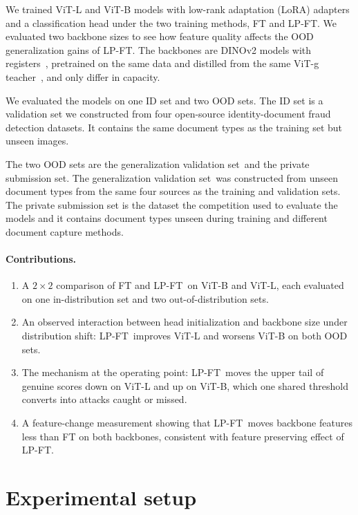 \documentclass[10pt]{article}
\newcommand{\lpft}{LP-FT}
\newcommand{\genval}{generalization validation set}
\begin{document}
We trained ViT-L and ViT-B models with low-rank adaptation (LoRA) adapters and a classification head under the two training methods, FT and \lpft. We evaluated two backbone sizes to see how feature quality affects the OOD generalization gains of \lpft. The backbones are DINOv2 models with registers~\citep{darcet2024registers}, pretrained on the same data and distilled from the same ViT-g teacher~\citep{oquab2023dinov2}, and only differ in capacity.

We evaluated the models on one ID set and two OOD sets. The ID set is a validation set we constructed from four open-source identity-document fraud detection datasets. It contains the same document types as the training set but unseen images.

The two OOD sets are the \genval\ and the private submission set. The \genval\ was constructed from unseen document types from the same four sources as the training and validation sets. The private submission set is the dataset the competition used to evaluate the models and it contains document types unseen during training and different document capture methods.

\paragraph{Contributions.}
\begin{enumerate}
  \item A $2\times2$ comparison of FT and \lpft\ on ViT-B and ViT-L, each evaluated on one in-distribution set and two out-of-distribution sets.
  \item An observed interaction between head initialization and backbone size under distribution shift: \lpft\ improves ViT-L and worsens ViT-B on both OOD sets.
  \item The mechanism at the operating point: \lpft\ moves the upper tail of genuine scores down on ViT-L and up on ViT-B, which one shared threshold converts into attacks caught or missed.
  \item A feature-change measurement showing that \lpft\ moves backbone features less than FT on both backbones, consistent with feature preserving effect of \lpft.
\end{enumerate}

\section{Experimental setup}
\end{document}
